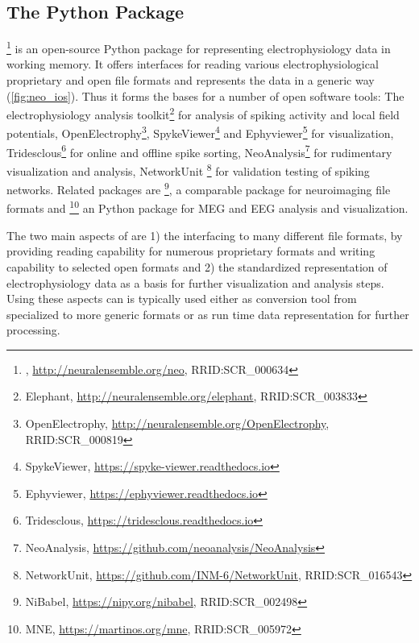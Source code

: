 




\subsection{The  Python Package}
\footnote{, \url{http://neuralensemble.org/neo}, RRID:SCR\_000634} \citep{Garcia_2014} is an open-source Python package for representing electrophysiology data in working memory. It offers interfaces for reading various electrophysiological proprietary and open file formats and represents the data in a generic way (\cref{fig:neo_ios}). Thus it forms the bases for a number of open software tools: The electrophysiology analysis toolkit\footnote{Elephant, \url{http://neuralensemble.org/elephant}, RRID:SCR\_003833} for analysis of spiking activity and local field potentials, OpenElectrophy\footnote{OpenElectrophy, \url{http://neuralensemble.org/OpenElectrophy}, RRID:SCR\_000819}, SpykeViewer\footnote{SpykeViewer, \url{https://spyke-viewer.readthedocs.io}} and Ephyviewer\footnote{Ephyviewer, \url{https://ephyviewer.readthedocs.io}} for visualization, Tridesclous\footnote{Tridesclous, \url{https://tridesclous.readthedocs.io}} for online and offline spike sorting, NeoAnalysis\footnote{NeoAnalysis, \url{https://github.com/neoanalysis/NeoAnalysis}} \citep{Zhang_2017} for rudimentary visualization and analysis, NetworkUnit \footnote{NetworkUnit, \url{https://github.com/INM-6/NetworkUnit}, RRID:SCR\_016543} for validation testing of spiking networks. Related packages are \footnote{NiBabel, \url{https://nipy.org/nibabel}, RRID:SCR\_002498}, a comparable package for neuroimaging file formats and \footnote{MNE, \url{https://martinos.org/mne}, RRID:SCR\_005972} an Python package for MEG and EEG analysis and visualization.

The two main aspects of  are 1) the interfacing to many different file formats, by providing reading capability for numerous proprietary formats and writing capability to selected open formats and 2) the standardized representation of electrophysiology data as a basis for further visualization and analysis steps. Using these aspects  can is typically used either as conversion tool from specialized to more generic formats or as run time data representation for further processing.

